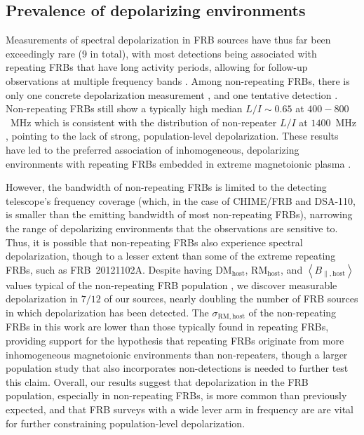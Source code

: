 \documentclass[twocolumn, linenumbers]{aastex701}
\begin{document}
\subsection{Prevalence of depolarizing environments} \label{sec:discussion_depol}
Measurements of spectral depolarization in FRB sources have thus far been exceedingly rare (9 in total), with most detections being associated with repeating FRBs that have long activity periods, allowing for follow-up observations at multiple frequency bands \citep{2022Sci...375.1266F, 2026ApJ..1000L..53P}. Among non-repeating FRBs, there is only one concrete depolarization measurement \citep{2025MNRAS.tmp.1894U}, and one tentative detection \citep{2024ApJ...968...50P}. Non-repeating FRBs still show a typically high median $L/I\sim0.65$ at $400-800$~MHz which is consistent with the distribution of non-repeater $L/I$ at $1400$~MHz \citep{2024ApJ...968...50P, Sherman_2024_ApJ}, pointing to the lack of strong, population-level depolarization. These results have led to the preferred association of inhomogeneous, depolarizing environments with repeating FRBs embedded in extreme magnetoionic plasma \citep{2020ApJ...895....7Y, 2022ApJ...928L..16Y, 2026arXiv260317615Y}.

However, the bandwidth of non-repeating FRBs is limited to the detecting telescope's frequency coverage (which, in the case of CHIME/FRB and DSA-110, is smaller than the emitting bandwidth of most non-repeating FRBs), narrowing the range of depolarizing environments that the observations are sensitive to. Thus, it is possible that non-repeating FRBs also experience spectral depolarization, though to a lesser extent than some of the extreme repeating FRBs, such as FRB~20121102A. Despite having $\mathrm{DM}_\mathrm{host}$, $\mathrm{RM}_\mathrm{host}$, and $\left<B_{\parallel,\mathrm{host}}\right>$ values typical of the non-repeating FRB population \citep{2024ApJ...968...50P, 2024ApJ...964..131S}, we discover measurable depolarization in $7/12$ of our sources, nearly doubling the number of FRB sources in which depolarization has been detected. The $\sigma_\mathrm{RM,host}$ of the non-repeating FRBs in this work are lower than those typically found in repeating FRBs, providing support for the hypothesis that repeating FRBs originate from more inhomogeneous magnetoionic environments than non-repeaters, though a larger population study that also incorporates non-detections is needed to further test this claim. Overall, our results suggest that depolarization in the FRB population, especially in non-repeating FRBs, is more common than previously expected, and that FRB surveys with a wide lever arm in frequency are are vital for further constraining population-level depolarization.
\end{document}
